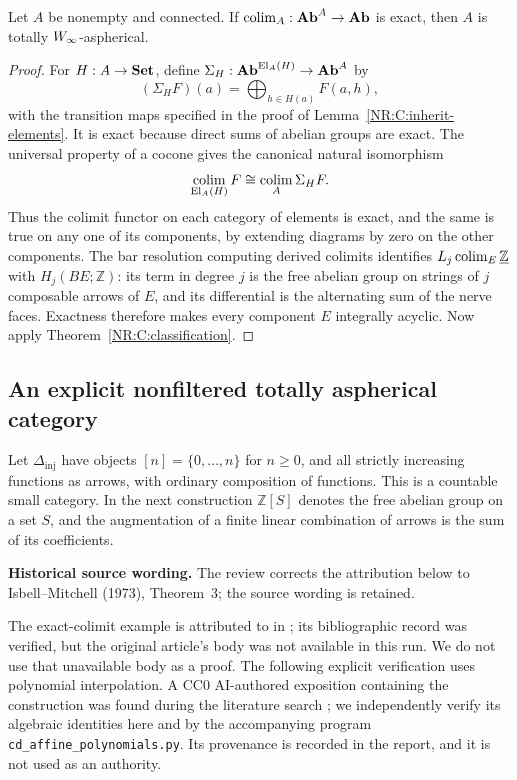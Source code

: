 \begin{nrproposition}\label{NR:C:exact-sufficient}
Let $A$ be nonempty and connected. If $\mathop{\operatorname{colim}}_A:\mathbf{Ab}^A\to\mathbf{Ab}$ is exact, then $A$ is totally $W_\infty$-aspherical.
\end{nrproposition}
\begin{proof}
For $H:A\to\mathbf{Set}$, define $\Sigma_H:\mathbf{Ab}^{\operatorname{El}_A(H)}\to\mathbf{Ab}^A$ by
\[
 (\Sigma_HF)(a)=\bigoplus_{h\in H(a)}F(a,h),
\]
with the transition maps specified in the proof of Lemma~\ref{NR:C:inherit-elements}. It is exact because direct sums of abelian groups are exact. The universal property of a cocone gives the canonical natural isomorphism
\[
 \mathop{\operatorname{colim}}_{\operatorname{El}_A(H)}F
   \cong\mathop{\operatorname{colim}}_A\Sigma_HF.
\]
Thus the colimit functor on each category of elements is exact, and the same is true on any one of its components, by extending diagrams by zero on the other components. The bar resolution computing derived colimits identifies
$L_j\mathop{\operatorname{colim}}_E\underline{\mathbb Z}$ with $H_j(BE;\mathbb Z)$: its term in degree $j$ is the free abelian group on strings of $j$ composable arrows of $E$, and its differential is the alternating sum of the nerve faces. Exactness therefore makes every component $E$ integrally acyclic. Now apply Theorem~\ref{NR:C:classification}.
\end{proof}

\subsection*{An explicit nonfiltered totally aspherical category}

\begin{nrdefinition}\label{NR:C:delta-definition}
Let $\Delta_{\mathrm{inj}}$ have objects $[n]=\{0,\ldots,n\}$ for $n\geq0$, and all strictly increasing functions as arrows, with ordinary composition of functions. This is a countable small category. In the next construction $\mathbb Z[S]$ denotes the free abelian group on a set $S$, and the augmentation of a finite linear combination of arrows is the sum of its coefficients.
\end{nrdefinition}

\noindent\textbf{Historical source wording.} The review corrects the attribution below to Isbell--Mitchell (1973), Theorem~3; the source wording is retained.\par\smallskip
The exact-colimit example is attributed to \citet{Isbell1974Exact} in \citet[Section~2.3, after Theorem~2.5]{Husainov2002Dimension}; its bibliographic record was verified, but the original article's body was not available in this run. We do not use that unavailable body as a proof. The following explicit verification uses polynomial interpolation. A CC0 AI-authored exposition containing the construction was found during the literature search \citep[Section~4]{OpenMaths2026Derived}; we independently verify its algebraic identities here and by the accompanying program \texttt{cd\_affine\_polynomials.py}. Its provenance is recorded in the report, and it is not used as an authority.

